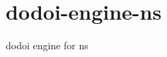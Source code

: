 \chapter{dodoi-\/engine-\/ns}
\hypertarget{md__r_e_a_d_m_e}{}\label{md__r_e_a_d_m_e}
\label{md__r_e_a_d_m_e_autotoc_md0}%
%
dodoi engine for ns 